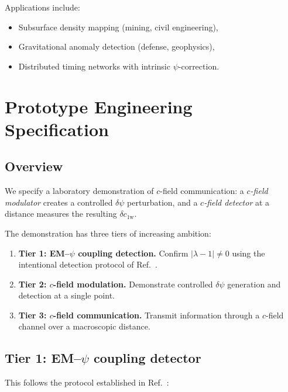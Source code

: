 \documentclass[aps,prd,twocolumn,superscriptaddress,nofootinbib,floatfix]{revtex4-2}
\newcommand{\psifield}{\psi}
\newcommand{\cfield}{c_{\text{1w}}}
\begin{document}
Applications include:
\begin{itemize}
\item Subsurface density mapping (mining, civil engineering),
\item Gravitational anomaly detection (defense, geophysics),
\item Distributed timing networks with intrinsic
$\psifield$-correction.
\end{itemize}

\section{Prototype Engineering Specification}
\label{sec:prototype}

\subsection{Overview}

We specify a laboratory demonstration of $c$-field communication:
a \emph{$c$-field modulator} creates a controlled
$\delta\psifield$ perturbation, and a \emph{$c$-field detector}
at a distance measures the resulting $\delta\cfield$.

The demonstration has three tiers of increasing ambition:

\begin{enumerate}
\item \textbf{Tier 1: EM--$\psifield$ coupling detection.}
Confirm $|\lambda-1| \neq 0$ using the intentional detection
protocol of Ref.~\cite{Alcock2025EMCoupling}.

\item \textbf{Tier 2: $c$-field modulation.} Demonstrate
controlled $\delta\psifield$ generation and detection at a
single point.

\item \textbf{Tier 3: $c$-field communication.} Transmit
information through a $c$-field channel over a macroscopic
distance.
\end{enumerate}

\subsection{Tier 1: EM--$\psifield$ coupling detector}
\label{subsec:tier1}

This follows the protocol established in
Ref.~\cite{Alcock2025EMCoupling}:
\end{document}
